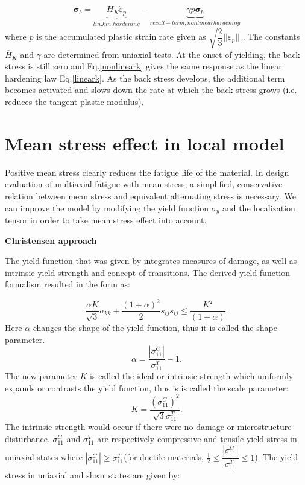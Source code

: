 \begin{equation}
\dot{\bm{\sigma}}_b=\underbrace{\overline{H}_K \dot{\varepsilon}_p}_{lin. kin. hardening} -\underbrace{\gamma\dot{p}\bm{\sigma}_b}_{recall - term, nonlinear hardening}
\label{nonlineark}
\end{equation}
where
$\dot{p}$ is the accumulated plastic strain rate given as $\sqrt{\dfrac{2}{3}}||\dot{\varepsilon}_p||$ . The constants
$\overline{H}_K$
and
$\gamma$
are determined from uniaxial tests.
At the onset of yielding, the
back stress is still zero and Eq.\eqref{nonlineark} gives the same response as the linear hardening
law Eq.\eqref{lineark}. As the back stress develops, the additional term becomes activated and
slows down the rate at which the back stress grows (i.e. reduces the tangent plastic
modulus).

\section{Mean stress effect in local model}
\label{sec:5.3}
Positive mean stress clearly reduces the fatigue life of the material. In design evaluation of multiaxial fatigue with mean stress, a simplified, conservative relation between mean stress and equivalent alternating stress is necessary. We can improve the model by modifying the yield function $\sigma_y$ and the localization tensor in order to take mean stress effect into account.

\vspace{6pt}
\textbf{Christensen approach}
\vspace{6pt}

The yield function that was given by \cite{christensen2000yield} integrates measures of damage, as well as intrinsic yield strength and concept of transitions. The derived yield function formalism resulted in the form as:

\begin{equation}
\frac{\alpha K}{\sqrt{3}}\sigma_{kk}+\frac{(1+\alpha)^2}{2}s_{ij}s_{ij}\leqslant\frac{K^2}{(1+\alpha)}.
\label{eq:yieldfunc}
\end{equation}
Here $\alpha$ changes the shape of the yield function, thus it is called the shape parameter. 
$$\alpha=\frac{\left| \sigma_{11}^C\right| }{\sigma_{11}^T}-1.$$
The new parameter $K$ is called the ideal or intrinsic strength which uniformly expands or contrasts the yield function, thus is is called the scale parameter:
$$K=\frac{(\sigma_{11}^C)^2}{\sqrt{3}\sigma_{11}^T}.$$
The intrinsic strength would occur if there were no damage or microstructure disturbance. 
$\sigma_{11}^C$ and $\sigma_{11}^T$ are respectively compressive and tensile yield stress in uniaxial states where $\left| \sigma_{11}^C\right| \geqslant\sigma_{11}^T$(for ductile materials, $\frac{1}{2}\leqslant\dfrac{\left| \sigma_{11}^C\right| }{\sigma_{11}^T}\leqslant 1$). The yield stress in uniaxial and shear states are given by:

